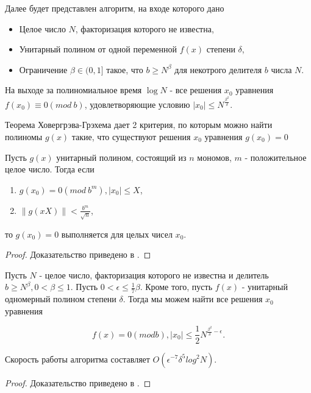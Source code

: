   Далее будет представлен алгоритм, на входе которого дано
    \begin{itemize}
     \item Целое число {$N$}, факторизация которого не известна,
     \item Унитарный полином от одной переменной {$f(x)$} степени {$\delta$},
     \item Ограничение {$\beta \in (0,1]$} такое, что {$b \ge N^\beta$} для некотрого делителя {$b$} числа {$N$}.
    \end{itemize}

    На выходе за полиномиальное время $\log{N}$ - все решения $x_0$ уравнения {$f(x_0) \equiv 0 (mod \: b)$}, удовлетворяющие условию
    {$|x_0| \le N^{\frac{\beta^2}{\delta}}$}.  
    
  Теорема Ховергрэва-Грэхема дает 2 критерия, по которым можно найти полиномы {$g(x)$} такие, что существуют решения $x_0$ уравнения $g(x_0)=0$

  \begin{theorem}
   Пусть {$g(x)$} унитарный полином, состоящий из {$n$} мономов, {$m$} - положительное целое число. Тогда если
   
    \begin{enumerate}
     \item {$g(x_0) = 0(mod \: b^m), |x_0| \le X$},
     \item {$ \lVert g(x X) \lVert < \frac{b^m}{\sqrt{n}} $},
    \end{enumerate}
    
    то {$g(x_0) = 0$} выполняется для целых чисел $x_0$.
    
    \begin{proof}
      Доказательство приведено в \cite[страницы 321-322]{may10}.
    \end{proof}

  \end{theorem}

  \begin{theorem}[Копперсмита]
    Пусть {$N$} - целое число, факторизация которого не известна и делитель {$b \ge N^\beta, 0 < \beta \le 1$}. Пусть {$0 < \epsilon \le \frac{1}{7}\beta$}.
    Кроме того, пусть {$f(x)$} - унитарный одномерный полином степени {$\delta$}. Тогда мы можем найти все решения {$x_0$} уравнения
    
      \begin{equation}
        f(x) = 0 (mod b), |x_0| \le \frac{1}{2} N^{\frac{\beta^2}{\delta} - \epsilon}.
      \end{equation}

    Скорость работы алгоритма составляет {$O(\epsilon^{-7} \delta^5 log^2 N)$}.
    
    \begin{proof}
      Доказательство приведено в \cite[страницы 323-326]{may10}.
    \end{proof}

  \end{theorem}

